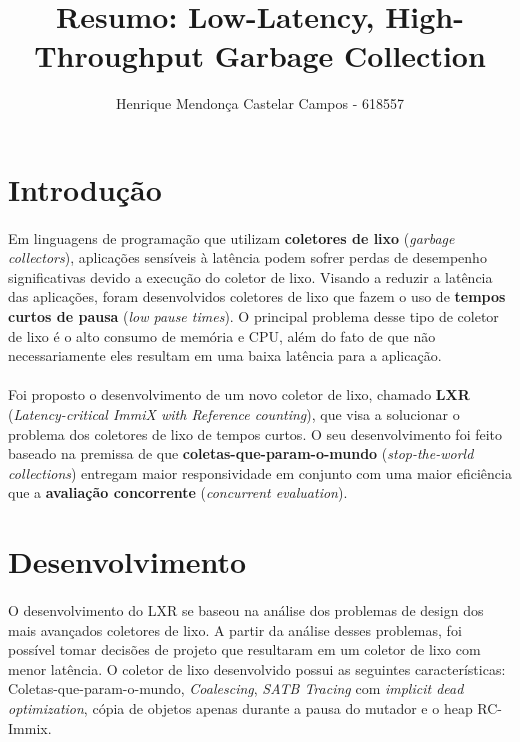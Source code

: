 \documentclass[12pt]{article}
\title{Resumo: Low-Latency, High-Throughput Garbage Collection}
\author{Henrique Mendonça Castelar Campos - 618557}
\begin{document}
 

\maketitle

\section{Introdução}

\paragraph{}Em linguagens de programação que utilizam \textbf{coletores de lixo} (\textit{garbage collectors}), aplicações sensíveis à latência podem sofrer perdas de desempenho significativas devido a execução do coletor de lixo. Visando a reduzir a latência das aplicações, foram desenvolvidos coletores de lixo que fazem o uso de \textbf{tempos curtos de pausa} (\textit{low pause times}). O principal problema desse tipo de coletor de lixo é o alto consumo de memória e CPU, além do fato de que não necessariamente eles resultam em uma baixa latência para a aplicação.

\paragraph{}Foi proposto o desenvolvimento de um novo coletor de lixo, chamado \textbf{LXR} (\textit{Latency-critical ImmiX with Reference counting}), que visa a solucionar o problema dos coletores de lixo de tempos curtos. O seu desenvolvimento foi feito baseado na premissa de que \textbf{coletas-que-param-o-mundo} (\textit{stop-the-world collections}) entregam maior responsividade em conjunto com uma maior eficiência que a \textbf{avaliação concorrente} (\textit{concurrent evaluation}).

\section{Desenvolvimento}

\paragraph{}O desenvolvimento do LXR se baseou na análise dos problemas de design dos mais avançados coletores de lixo. A partir da análise desses problemas, foi possível tomar decisões de projeto que resultaram em um coletor de lixo com menor latência. O coletor de lixo desenvolvido possui as seguintes características: Coletas-que-param-o-mundo, \textit{Coalescing}, \textit{SATB Tracing} com \textit{implicit dead optimization}, cópia de objetos apenas durante a pausa do mutador e o heap RC-Immix.
\end{document}
